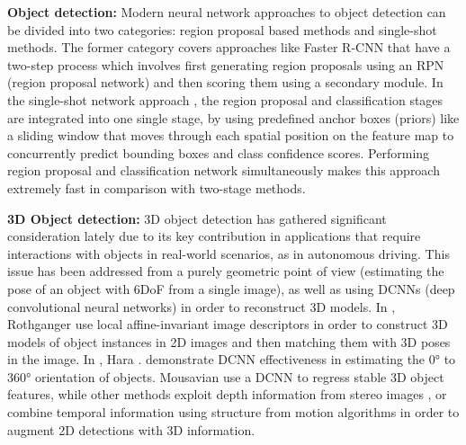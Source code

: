 \documentclass[10pt,twocolumn,letterpaper]{article}
\begin{document}
\textbf{Object detection: } Modern neural network approaches to object detection can be divided into two categories: region proposal based methods and single-shot methods. The former category covers approaches like Faster R-CNN \cite{faster} that have a two-step process which involves first generating region proposals using an RPN (region proposal network) and then scoring them using a secondary module. In the single-shot network approach \cite{ssd}, the region proposal and classification stages are integrated into one single stage, by using predefined anchor boxes (priors) like a sliding window that moves through each spatial position on the feature map to concurrently predict bounding boxes and class confidence scores. Performing region proposal and classification network simultaneously makes this approach extremely fast in comparison with two-stage methods.

\textbf{3D Object detection: } 3D object detection has gathered significant consideration lately due to its key contribution in applications that require interactions with objects in real-world scenarios, as in autonomous driving.  This issue has been addressed from a purely geometric point of view (\eg estimating the pose of an object with 6DoF from a single image), as well as using DCNNs (deep convolutional neural networks) in order to reconstruct 3D models. In \cite{Rothganger}, Rothganger \etal  use local affine-invariant image descriptors in order to construct 3D models of object instances in 2D images and then matching them with 3D poses in the image. In \cite{Hara2017DesigningDC}, Hara \etal. demonstrate DCNN effectiveness in estimating the \ang{0} to \ang{360} orientation of objects. Mousavian \etal \cite{Mousavian} use a DCNN to regress stable 3D object features, while other methods exploit depth information from stereo images \cite{3DOP-stereo}, or combine temporal information using structure from motion algorithms in order to augment 2D detections with 3D information.
\end{document}
